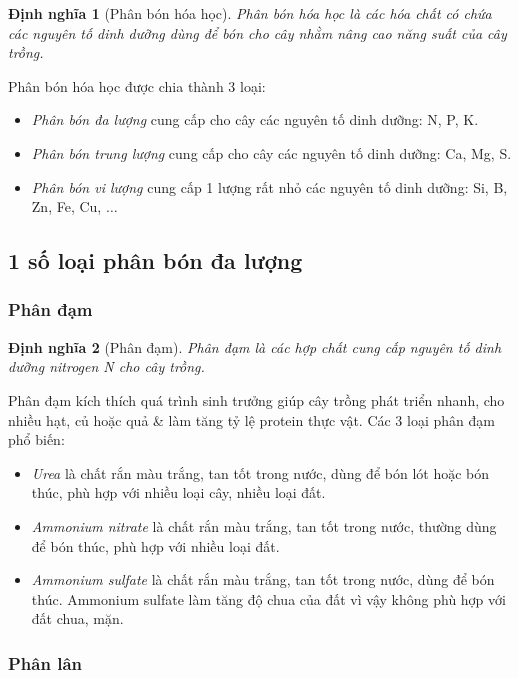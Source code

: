 \documentclass{article}
\newtheorem{dinhnghia}{Định nghĩa}
\begin{document}
\begin{dinhnghia}[Phân bón hóa học]
	\emph{Phân bón hóa học} là các hóa chất có chứa các nguyên tố dinh dưỡng dùng để bón cho cây nhằm nâng cao năng suất của cây trồng.
\end{dinhnghia}
Phân bón hóa học được chia thành 3 loại:
\begin{itemize}
	\item \textit{Phân bón đa lượng} cung cấp cho cây các nguyên tố dinh dưỡng: N, P, K.
	\item \textit{Phân bón trung lượng} cung cấp cho cây các nguyên tố dinh dưỡng: Ca, Mg, S.
	\item \textit{Phân bón vi lượng} cung cấp 1 lượng rất nhỏ các nguyên tố dinh dưỡng: Si, B, Zn, Fe, Cu, $\ldots$
\end{itemize}

\subsection{1 số loại phân bón đa lượng}

\subsubsection{Phân đạm}

\begin{dinhnghia}[Phân đạm]
	\emph{Phân đạm} là các hợp chất cung cấp nguyên tố dinh dưỡng nitrogen \emph{N} cho cây trồng.
\end{dinhnghia}
Phân đạm kích thích quá trình sinh trưởng giúp cây trồng phát triển nhanh, cho nhiều hạt, củ hoặc quả \& làm tăng tỷ lệ protein thực vật. Các 3 loại phân đạm phổ biến:
\begin{itemize}
	\item \textit{Urea}  là chất rắn màu trắng, tan tốt trong nước, dùng để bón lót hoặc bón thúc, phù hợp với nhiều loại cây, nhiều loại đất.
	\item \textit{Ammonium nitrate}  là chất rắn màu trắng, tan tốt trong nước, thường dùng để bón thúc, phù hợp với nhiều loại đất.
	\item \textit{Ammonium sulfate}  là chất rắn màu trắng, tan tốt trong nước, dùng để bón thúc. Ammonium sulfate làm tăng độ chua của đất vì vậy không phù hợp với đất chua, mặn.
\end{itemize}

\subsubsection{Phân lân}
\end{document}
